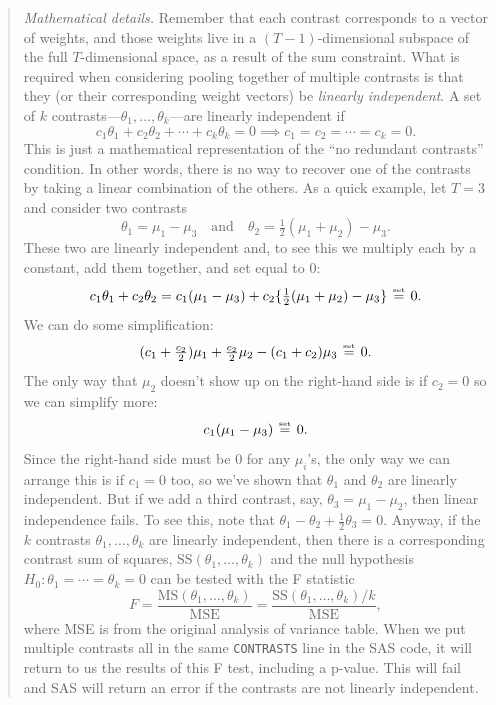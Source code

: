 \documentclass[a4paper, 12pt]{article}
\theoremstyle{plain}
\theoremstyle{definition}
\theoremstyle{remark}
\begin{document}
\begin{quote}
{\em Mathematical details.}  Remember that each contrast corresponds to a vector of weights, and those weights live in a $(T-1)$-dimensional subspace of the full $T$-dimensional space, as a result of the sum constraint.  What is required when considering pooling together of multiple contrasts is that they (or their corresponding weight vectors) be {\em linearly independent}.  A set of $k$ contrasts---$\theta_1,\ldots,\theta_k$---are linearly independent if 
\[ c_1\theta_1 + c_2 \theta_2 + \cdots + c_k \theta_k = 0 \implies c_1 = c_2 = \cdots = c_k = 0. \]
This is just a mathematical representation of the ``no redundant contrasts'' condition.  In other words, there is no way to recover one of the contrasts by taking a linear combination of the others.  As a quick example, let $T=3$ and consider two contrasts 
\[ \theta_1 = \mu_1 - \mu_3 \quad \text{and} \quad \theta_2 = \tfrac12(\mu_1 + \mu_2) - \mu_3. \]
These two are linearly independent and, to see this we multiply each by a constant, add them together, and set equal to 0:
\[ c_1 \theta_1 + c_2 \theta_2 = c_1 (\mu_1 - \mu_3) + c_2 \{\tfrac12(\mu_1 + \mu_2) - \mu_3\} \overset{\text{\tiny set}}{\, = \,} 0. \]
We can do some simplification:
\[ (c_1 + \tfrac{c_2}{2})\mu_1 + \tfrac{c_2}{2} \mu_2 - (c_1 + c_2) \mu_3 \overset{\text{\tiny set}}{\, = \,} 0. \]
The only way that $\mu_2$ doesn't show up on the right-hand side is if $c_2=0$ so we can simplify more:
\[ c_1 (\mu_1 - \mu_3) \overset{\text{\tiny set}}{\, = \,} 0. \]
Since the right-hand side must be 0 for any $\mu_i$'s, the only way we can arrange this is if $c_1=0$ too, so we've shown that $\theta_1$ and $\theta_2$ are linearly independent.  But if we add a third contrast, say, $\theta_3 = \mu_1-\mu_2$, then linear independence fails.  To see this, note that $\theta_1 - \theta_2 + \tfrac12 \theta_3 = 0$.  Anyway, if the $k$ contrasts $\theta_1,\ldots,\theta_k$ are linearly independent, then there is a corresponding contrast sum of squares, $\text{SS}(\theta_1,\ldots,\theta_k)$ and the null hypothesis $H_0: \theta_1 = \cdots = \theta_k = 0$ can be tested with the F statistic 
\[ F = \frac{\text{MS}(\theta_1,\ldots,\theta_k)}{\text{MSE}} = \frac{\text{SS}(\theta_1,\ldots,\theta_k)/k}{\text{MSE}}, \]
where MSE is from the original analysis of variance table.  When we put multiple contrasts all in the same {\tt CONTRASTS} line in the SAS code, it will return to us the results of this F test, including a p-value.  This will fail and SAS will return an error if the contrasts are not linearly independent.  
\end{quote}
\end{document}
